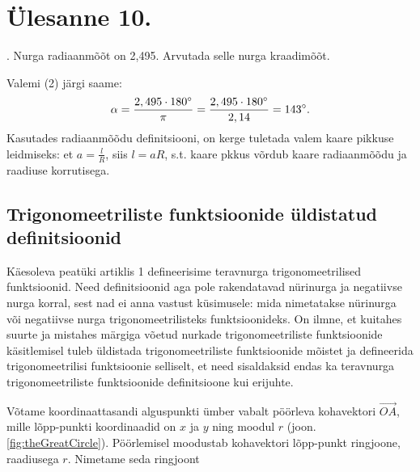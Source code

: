 \section{Ülesanne 10.}


\indent{}. Nurga radiaanmõõt on 2,495. Arvutada selle nurga kraadimõõt.
\begin{solution}
Valemi (2) järgi saame:
\begin{displaymath}
\alpha = \frac{2,495 \cdot 180 \degree}{\pi} = \frac{2,495 \cdot 180 \degree}{2,14} = 143 \degree.
\end{displaymath}
Kasutades radiaanmõõdu definitsiooni, on kerge tuletada valem kaare pikkuse leidmiseks: et $a=\frac{l}{R}$, siis $l=aR$, s.t. kaare pkkus võrdub kaare radiaanmõõdu ja raadiuse korrutisega.
\end{solution}

\subsection{Trigonomeetriliste funktsioonide üldistatud definitsioonid}

Käesoleva peatüki artiklis 1 defineerisime teravnurga trigonomeetrilised funktsioonid. Need definitsioonid aga pole rakendatavad nürinurga ja negatiivse nurga korral, sest nad ei anna vastust küsimusele: mida nimetatakse nürinurga või negatiivse nurga trigonomeetrilisteks funktsioonideks. On ilmne, et kuitahes suurte ja mistahes märgiga võetud nurkade trigonomeetriliste funktsioonide käsitlemisel tuleb üldistada trigonomeetriliste funktsioonide mõistet ja defineerida trigonomeetrilisi funktsioonie selliselt, et need sisaldaksid endas ka teravnurga trigonomeetriliste funktsioonide definitsioone kui erijuhte.

Võtame koordinaattasandi alguspunkti ümber vabalt pöörleva kohavektori $\overrightarrow{OA}$, mille lõpp-punkti koordinaadid on $x$ ja $y$ ning moodul $r$ (joon. \ref{fig:theGreatCircle}). Pöörlemisel moodustab kohavektori lõpp-punkt ringjoone, raadiusega $r$. Nimetame seda ringjoont



